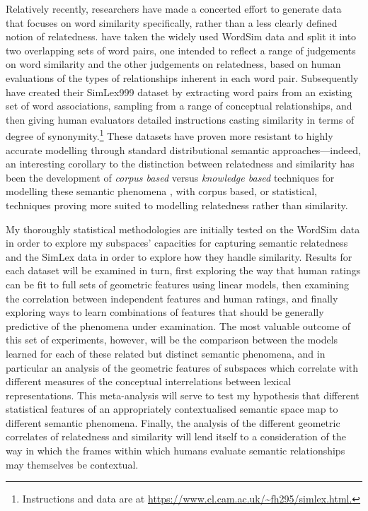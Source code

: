 Relatively recently, researchers have made a concerted effort to generate data that focuses on word similarity specifically, rather than a less clearly defined notion of relatedness.  \cite{AgirreEA2009} have taken the widely used WordSim data and split it into two overlapping sets of word pairs, one intended to reflect a range of judgements on word similarity and the other judgements on relatedness, based on human evaluations of the types of relationships inherent in each word pair.  Subsequently \cite{HillEA2015} have created their SimLex999 dataset by extracting word pairs from an existing set of word associations, sampling from a range of conceptual relationships, and then giving human evaluators detailed instructions casting similarity in terms of degree of synonymity.\footnote{Instructions and data are at \url{https://www.cl.cam.ac.uk/~fh295/simlex.html.}}  These datasets have proven more resistant to highly accurate modelling through standard distributional semantic approaches---indeed, an interesting corollary to the distinction between relatedness and similarity has been the development of \emph{corpus based} versus \emph{knowledge based} techniques for modelling these semantic phenomena \citep[see][for a discussion]{MihalceaEA2006,HassanEA2011}, with corpus based, or statistical, techniques proving more suited to modelling relatedness rather than similarity.

My thoroughly statistical methodologies are initially tested on the WordSim data in order to explore my subspaces' capacities for capturing semantic relatedness and the SimLex data in order to explore how they handle similarity.  Results for each dataset will be examined in turn, first exploring the way that human ratings can be fit to full sets of geometric features using linear models, then examining the correlation between independent features and human ratings, and finally exploring ways to learn combinations of features that should be generally predictive of the phenomena under examination.  The most valuable outcome of this set of experiments, however, will be the comparison between the models learned for each of these related but distinct semantic phenomena, and in particular an analysis of the geometric features of subspaces which correlate with different measures of the conceptual interrelations between lexical representations.  This meta-analysis will serve to test my hypothesis that different statistical features of an appropriately contextualised semantic space map to different semantic phenomena.  Finally, the analysis of the different geometric correlates of relatedness and similarity will lend itself to a consideration of the way in which the frames within which humans evaluate semantic relationships may themselves be contextual.

